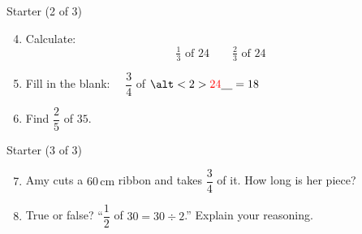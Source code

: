 \documentclass{beamer}
\newcommand{\ablank}[1]{%
  \alt<2>{\textcolor{red}{#1}}{\underline{\phantom{#1}}}%
}
\newcommand{\ashow}[1]{\uncover<2->{\textcolor{red}{\small #1}}}
\begin{document}
\begin{frame}{Starter (2 of 3)}

\vspace{-2em}

\small
\begin{enumerate}
\setcounter{enumi}{3}
  \item Calculate:
  \[
    \tfrac{1}{3} \text{ of } 24 \qquad \tfrac{2}{3} \text{ of } 24
  \]
  \ashow{$8$ and $16$}
  \item Fill in the blank: $\quad \dfrac{3}{4}$ of $\ablank{24} = 18$
  \item Find $\dfrac{2}{5}$ of $35$. \ashow{$14$}
\end{enumerate}
\end{frame}

\begin{frame}{Starter (3 of 3)}

\vspace{-2em}

\small
\begin{enumerate}
\setcounter{enumi}{6}
  \item Amy cuts a  $60\,\text{cm}$ ribbon and takes $\dfrac{3}{4}$ of it. How long is her piece? \ashow{$45$ cm}
  \item True or false? ``$\dfrac{1}{2}$ of $30 = 30 \div 2$.'' Explain your reasoning.
  \ashow{True. $\tfrac12$ of $30 = 15$ and $30 \div 2 = 15$.}
\end{enumerate}
\end{frame}
\end{document}
